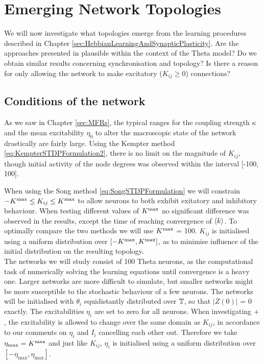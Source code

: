 \newpage
\section{\mywork Emerging Network Topologies} \label{sec:EmergingNetworkTopologies}

We will now investigate what topologies emerge from the learning procedures described in Chapter \ref{sec:HebbianLearningAndSynapticPlasticity}. Are the approaches presented in \cite{Kempter1999, Song2000, Song2017, ChrolCannon2012} plausible within the context of the Theta model? Do we obtain similar results concerning synchronisation and topology? Is there a reason for only allowing the network to make excitatory ($K_{ij} \geq 0$) connections? 

\subsection{Conditions of the network}
As we saw in Chapter \ref{sec:MFRs}, the typical ranges for the coupling strength $\kappa$ and the mean excitability $\eta_0$ to alter the macroscopic state of the network drastically are fairly large. Using the Kempter method \eqref{eq:KempterSTDPFormulation2}, there is no limit on the magnitude of $K_{ij}$, though initial activity of the node degrees was observed within the interval [-100, 100]. 

When using the Song method \eqref{eq:SongSTDPFormulation} we will constrain $-K^{\rm max} \leq K_{ij} \leq K^{\rm max}$ to allow neurons to both exhibit exitatory and inhibitory behaviour. When testing different values of $K^{\rm max}$ no significant difference was observed in the results, except the time of reaching convergence of ${\langle k\rangle}$. To optimally compare the two methods we will use $K^{\rm max}$ = 100. $K_{ij}$ is initialised using a uniform distribution over $[-K^{\rm max}, K^{\rm max}]$, as to minimise influence of the initial distribution on the resulting topology.\\

The networks we will study consist of 100 Theta neurons, as the computational task of numerically solving the learning equations until convergence is a heavy one. Larger networks are more difficult to simulate, but smaller networks might be more susceptible to the stochastic behaviour of a few neurons. The networks will be initialised with $\theta_i$ equidistantly distributed over ${\mathbb{T}}$, so that $| Z(0) |$ = 0 exactly. The excitabilities $\eta_i$ are set to zero for all neurons. 
When investigating \STDP + \IP, the excitability is allowed to change over the same domain as $K_{ij}$, in accordance to our comments on $\eta_i$ and $I_i$ cancelling each other out. Therefore we take $\eta_{\max} = K^{\rm max}$ and just like $K_{ij}$, $\eta_i$ is initialised using a uniform distribution over $[-\eta_{\max}, \eta_{\max}]$.


